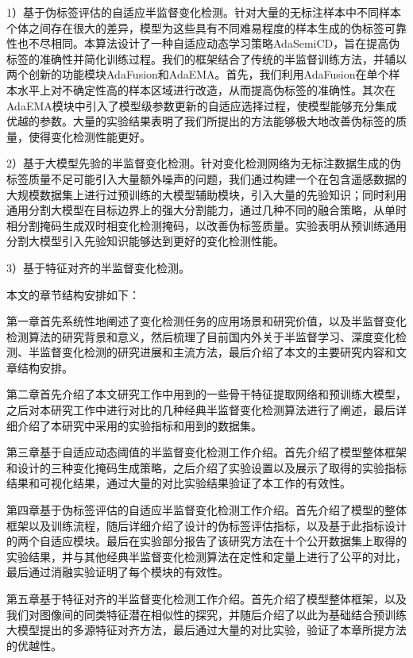 \documentclass[lang=chs, degree=master, blindreview=false, adobe=false]{yanputhesis}
\begin{document}
1）基于伪标签评估的自适应半监督变化检测。针对大量的无标注样本中不同样本个体之间存在很大的差异，模型为这些具有不同难易程度的样本生成的伪标签可靠性也不尽相同。本算法设计了一种自适应动态学习策略AdaSemiCD，旨在提高伪标签的准确性并简化训练过程。我们的框架结合了传统的半监督训练方法，并辅以两个创新的功能模块AdaFusion和AdaEMA。首先，我们利用AdaFusion在单个样本水平上对不确定性高的样本区域进行改造，从而提高伪标签的准确性。其次在AdaEMA模块中引入了模型级参数更新的自适应选择过程，使模型能够充分集成优越的参数。大量的实验结果表明了我们所提出的方法能够极大地改善伪标签的质量，使得变化检测性能更好。

2）基于大模型先验的半监督变化检测。针对变化检测网络为无标注数据生成的伪标签质量不足可能引入大量额外噪声的问题，我们通过构建一个在包含遥感数据的大规模数据集上进行过预训练的大模型辅助模块，引入大量的先验知识；同时利用通用分割大模型在目标边界上的强大分割能力，通过几种不同的融合策略，从单时相分割掩码生成双时相变化检测掩码，以改善伪标签质量。实验表明从预训练通用分割大模型引入先验知识能够达到更好的变化检测性能。

3）基于特征对齐的半监督变化检测。

本文的章节结构安排如下：

第一章首先系统性地阐述了变化检测任务的应用场景和研究价值，以及半监督变化检测算法的研究背景和意义，然后梳理了目前国内外关于半监督学习、深度变化检测、半监督变化检测的研究进展和主流方法，最后介绍了本文的主要研究内容和文章结构安排。

第二章首先介绍了本文研究工作中用到的一些骨干特征提取网络和预训练大模型，之后对本研究工作中进行对比的几种经典半监督变化检测算法进行了阐述，最后详细介绍了本研究中采用的实验指标和用到的数据集。

第三章基于自适应动态阈值的半监督变化检测工作介绍。首先介绍了模型整体框架和设计的三种变化掩码生成策略，之后介绍了实验设置以及展示了取得的实验指标结果和可视化结果，通过大量的对比实验结果验证了本工作的有效性。

第四章基于伪标签评估的自适应半监督变化检测工作介绍。首先介绍了模型的整体框架以及训练流程，随后详细介绍了设计的伪标签评估指标，以及基于此指标设计的两个自适应模块。最后在实验部分报告了该研究方法在十个公开数据集上取得的实验结果，并与其他经典半监督变化检测算法在定性和定量上进行了公平的对比，最后通过消融实验证明了每个模块的有效性。

第五章基于特征对齐的半监督变化检测工作介绍。首先介绍了模型整体框架，以及我们对图像间的同类特征潜在相似性的探究，并随后介绍了以此为基础结合预训练大模型提出的多源特征对齐方法，最后通过大量的对比实验，验证了本章所提方法的优越性。
\end{document}

